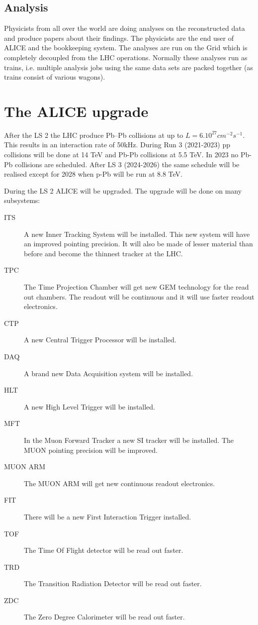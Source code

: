\subsection{Analysis}
Physicists from all over the world are doing analyses on the reconstructed data and produce papers about their findings. The physicists are the end user of ALICE and the bookkeeping system. The analyses are run on the Grid which is completely decoupled from the LHC operations. Normally these analyses run as trains, i.e. multiple analysis jobs using the same data sets are packed together (as trains consist of various wagons).



\section{The ALICE upgrade}
After the LS 2 the LHC produce Pb–Pb collisions at up to $L = 6.10^{27} cm^{-2} s^{-1}$. This results in an interaction rate of 50kHz. During Run 3 (2021-2023) pp collisions will be done at 14 TeV and Pb-Pb collisions at 5.5 TeV. In 2023 no Pb-Pb collisions are scheduled. After LS 3 (2024-2026) the same schedule will be realised except for 2028 when p-Pb will be run at 8.8 TeV.

During the LS 2 ALICE will be upgraded. The upgrade will be done on many subsystems:
\begin{description}
  \item[ITS] A new Inner Tracking System will be installed. This new system will have an improved pointing precision. It will also be made of lesser material than before and become the thinnest tracker at the LHC.
  \item[TPC] The Time Projection Chamber will get new GEM technology for the read out chambers. The readout will be continuous and it will use faster readout electronics.
  \item[CTP] A new Central Trigger Processor will be installed.
  \item[DAQ] A brand new Data Acquisition system will be installed.
  \item[HLT] A new High Level Trigger will be installed.
  \item[MFT] In the Muon Forward Tracker a new SI tracker will be installed. The MUON pointing precision will be improved.
  \item[MUON ARM] The MUON ARM will get new continuous readout electronics.
  \item[FIT] There will be a new First Interaction Trigger installed.
  \item[TOF] The Time Of Flight detector will be read out faster.
  \item[TRD] The Transition Radiation Detector will be read out faster.
  \item[ZDC] The Zero Degree Calorimeter will be read out faster.
\end{description}

